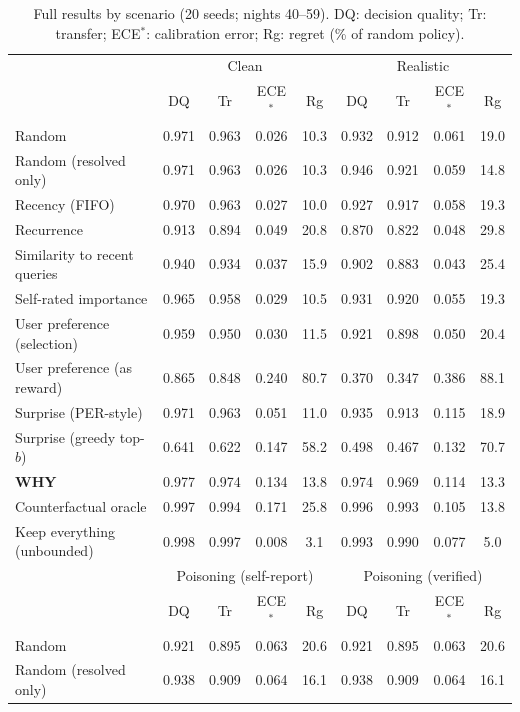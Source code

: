 \begin{table}[H]
\centering\footnotesize
\caption{Full results by scenario (20 seeds; nights 40--59). DQ: decision quality; Tr: transfer; ECE$^\ast$: calibration error; Rg: regret (\% of random policy).}
\label{tab:full}
\setlength{\tabcolsep}{3pt}
\begin{tabular}{@{}lcccccccc@{}}
\toprule
 & \multicolumn{4}{c}{Clean} & \multicolumn{4}{c}{Realistic}\\
 & DQ & Tr & ECE$^\ast$ & Rg & DQ & Tr & ECE$^\ast$ & Rg\\
\midrule
Random & 0.971 & 0.963 & 0.026 & 10.3 & 0.932 & 0.912 & 0.061 & 19.0\\
Random (resolved only) & 0.971 & 0.963 & 0.026 & 10.3 & 0.946 & 0.921 & 0.059 & 14.8\\
Recency (FIFO) & 0.970 & 0.963 & 0.027 & 10.0 & 0.927 & 0.917 & 0.058 & 19.3\\
Recurrence & 0.913 & 0.894 & 0.049 & 20.8 & 0.870 & 0.822 & 0.048 & 29.8\\
Similarity to recent queries & 0.940 & 0.934 & 0.037 & 15.9 & 0.902 & 0.883 & 0.043 & 25.4\\
Self-rated importance & 0.965 & 0.958 & 0.029 & 10.5 & 0.931 & 0.920 & 0.055 & 19.3\\
User preference (selection) & 0.959 & 0.950 & 0.030 & 11.5 & 0.921 & 0.898 & 0.050 & 20.4\\
User preference (as reward) & 0.865 & 0.848 & 0.240 & 80.7 & 0.370 & 0.347 & 0.386 & 88.1\\
Surprise (PER-style) & 0.971 & 0.963 & 0.051 & 11.0 & 0.935 & 0.913 & 0.115 & 18.9\\
Surprise (greedy top-$b$) & 0.641 & 0.622 & 0.147 & 58.2 & 0.498 & 0.467 & 0.132 & 70.7\\
\textbf{WHY} & 0.977 & 0.974 & 0.134 & 13.8 & 0.974 & 0.969 & 0.114 & 13.3\\
Counterfactual oracle & 0.997 & 0.994 & 0.171 & 25.8 & 0.996 & 0.993 & 0.105 & 13.8\\
Keep everything (unbounded) & 0.998 & 0.997 & 0.008 & 3.1 & 0.993 & 0.990 & 0.077 & 5.0\\
\midrule
 & \multicolumn{4}{c}{Poisoning (self-report)} & \multicolumn{4}{c}{Poisoning (verified)}\\
 & DQ & Tr & ECE$^\ast$ & Rg & DQ & Tr & ECE$^\ast$ & Rg\\
\midrule
Random & 0.921 & 0.895 & 0.063 & 20.6 & 0.921 & 0.895 & 0.063 & 20.6\\
Random (resolved only) & 0.938 & 0.909 & 0.064 & 16.1 & 0.938 & 0.909 & 0.064 & 16.1\\

\end{tabular}
\end{table}
